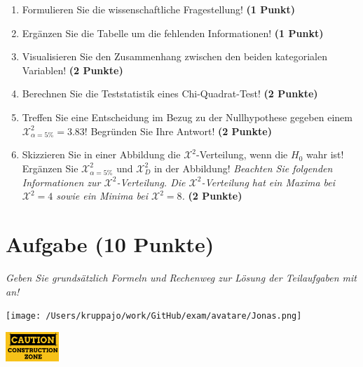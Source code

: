 \documentclass[a4paper, 9pt]{scrartcl}\usepackage[]{graphicx}\usepackage[]{xcolor}
\begin{document}
\begin{enumerate}
\item Formulieren Sie die wissenschaftliche Fragestellung! \textbf{(1 Punkt)}
\item Ergänzen Sie die Tabelle um die fehlenden Informationen! \textbf{(1 Punkt)} 
\item Visualisieren Sie den Zusammenhang zwischen den beiden kategorialen Variablen! \textbf{(2 Punkte)}
\item Berechnen Sie die Teststatistik eines Chi-Quadrat-Test! \textbf{(2 Punkte)}
\item Treffen Sie eine Entscheidung im Bezug zu der Nullhypothese gegeben
  einem $\mathcal{X}^2_{\alpha = 5\%} = 3.83$! Begründen Sie Ihre Antwort!
  \textbf{(2 Punkte)}
\item Skizzieren Sie in einer Abbildung die $\mathcal{X}^2$-Verteilung, wenn die $H_0$ wahr ist! Ergänzen Sie  $\mathcal{X}^2_{\alpha = 5\%}$ und $\mathcal{X}^2_{D}$ in der Abbildung! \textit{Beachten Sie folgenden Informationen zur $\mathcal{X}^2$-Verteilung. Die $\mathcal{X}^2$-Verteilung hat ein Maxima bei $\mathcal{X}^2 = 4$ sowie ein Minima bei $\mathcal{X}^2 = 8$.} \textbf{(2 Punkte)}
\end{enumerate} 
\clearpage

\section{Aufgabe \hfill (10 Punkte)}

\textit{Geben Sie grundsätzlich Formeln und Rechenweg zur Lösung der Teilaufgaben mit an!} \\[1Ex]
 

 
\begin{minipage}[t]{0.5\textwidth}
\texttt{[image: /Users/kruppajo/work/GitHub/exam/avatare/Jonas.png]}
\end{minipage}
\begin{minipage}[t]{0.5\textwidth}
\hfill
\href{https://youtu.be/-Kva5wc5Elw}{\includegraphics[width = 2cm]{img/caution}}
\end{minipage}
\vspace{-3Ex}
\end{document}
